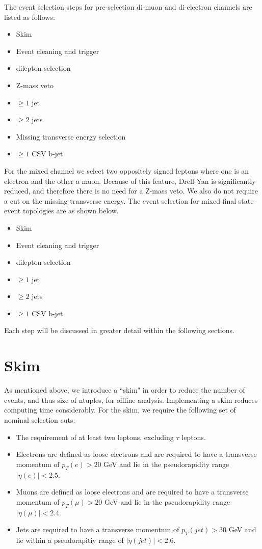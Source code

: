 The event selection steps for pre-selection di-muon and di-electron channels are listed as follows:  

\begin{itemize}
	\item Skim
	\item Event cleaning and trigger
	\item dilepton selection
	\item Z-mass veto
	\item $\geq 1$ jet
	\item $\geq 2$ jets
	\item Missing transverse energy selection
	\item $\geq 1$ CSV b-jet 
\end{itemize}

For the mixed channel we select two oppositely signed leptons where one is an electron and the other a muon. Because of this feature, Drell-Yan is significantly reduced, and therefore there is no need for a Z-mass veto. We also do not require a cut on the missing transverse energy. The event selection for mixed final state event topologies are as shown below.

\begin{itemize}
	\item Skim
	\item Event cleaning and trigger
	\item dilepton selection
	\item $\geq 1$ jet
	\item $\geq 2$ jets
	\item $\geq 1$ CSV b-jet 
\end{itemize}  

Each step will be discussed in greater detail within the following sections. 

\section{Skim}

As mentioned above, we introduce a ``skim" in order to reduce the number of events, and thus size of ntuples, for offline analysis. Implementing a skim reduces computing time considerably. For the skim, we require the following set of nominal selection cuts:

\begin{itemize}
	\item The requirement of at least two leptons, excluding $\tau$ leptons.
	\item Electrons are defined as loose electrons and are required to have a transverse momentum of $p_T(e) > 20$ GeV and lie in the pseudorapidity range $|\eta(e)| < 2.5$.
	\item Muons are defined as loose electrons and are required to have a transverse momentum of $p_T(\mu) > 20$ GeV and lie in the pseudorapidity range $|\eta(\mu)| < 2.4$.
	\item Jets are required to have a transverse momentum of $p_T(jet) > 30$ GeV and lie within a pseudorapitiy range of $|\eta(jet)| < 2.6$.
\end{itemize}

